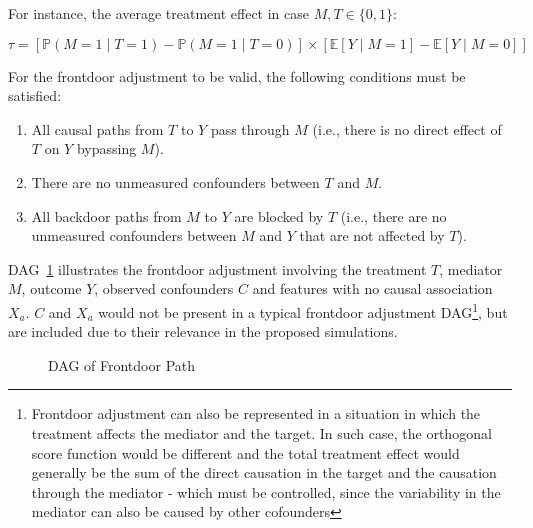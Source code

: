 \documentclass{article}
\numberwithin{equation}{section}
\begin{document}
For instance, the average treatment effect in case $M, T \in \{0, 1\}$:

\begin{equation}
\tau = \left[ \mathbb{P}(M = 1 \mid T = 1) - \mathbb{P}(M = 1 \mid T = 0) \right] \times \left[ \mathbb{E}[Y \mid M = 1] - \mathbb{E}[Y \mid M = 0] \right]
\end{equation}

For the frontdoor adjustment to be valid, the following conditions must be satisfied:

\begin{enumerate}
\item All causal paths from $T$ to $Y$ pass through $M$ (i.e., there is no direct effect of $T$ on $Y$ bypassing $M$).
\item There are no unmeasured confounders between $T$ and $M$.
\item All backdoor paths from $M$ to $Y$ are blocked by $T$ (i.e., there are no unmeasured confounders between $M$ and $Y$ that are not affected by $T$).
\end{enumerate}

DAG~\ref{fig:dag_frontdoor_path} illustrates the frontdoor adjustment involving the treatment $T$, mediator $M$, outcome $Y$, observed confounders $C$ and features with no causal association $X_a$. $C$ and $X_a$ would not be present in a typical frontdoor adjustment DAG\footnote{Frontdoor adjustment can also be represented in a situation in which the treatment affects the mediator and the target. In such case, the orthogonal score function would be different and the total treatment effect would generally be the sum of the direct causation in the target and the causation through the mediator - which must be controlled, since the variability in the mediator can also be caused by other cofounders}, but are included due to their relevance in the proposed simulations.

\begin{figure}[H]
    \centering
    \caption{DAG of Frontdoor Path}
    \label{fig:dag_frontdoor_path}
\end{figure}
\end{document}

